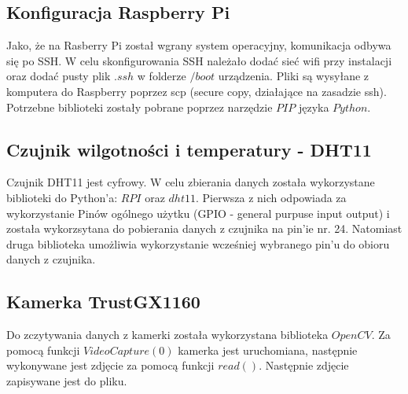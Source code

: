 \documentclass[runningheads]{llncs}
\begin{document}
\subsection{Konfiguracja Raspberry Pi}
Jako, że na Rasberry Pi został wgrany system operacyjny, komunikacja odbywa się po SSH. W celu skonfigurowania SSH należało dodać sieć wifi przy instalacji oraz dodać pusty plik $.ssh$ w folderze $/boot$ urządzenia. Pliki są wysyłane z komputera do Raspberry poprzez scp (secure copy, działające na zasadzie ssh). Potrzebne biblioteki zostały pobrane poprzez narzędzie $PIP$ języka $Python$.
\subsection{Czujnik wilgotności i temperatury - DHT11}
Czujnik DHT11 jest cyfrowy. W celu zbierania danych została wykorzystane biblioteki do Python'a: $RPI$ oraz $dht11$. Pierwsza z nich odpowiada za wykorzystanie Pinów ogólnego użytku (GPIO - general purpuse input output) i została wykorzsytana do pobierania danych z czujnika na pin'ie nr. 24. Natomiast druga biblioteka umożliwia wykorzystanie wcześniej wybranego pin'u do obioru danych z czujnika.
\subsection{Kamerka TrustGX1160}
Do zczytywania danych z kamerki została wykorzystana biblioteka $OpenCV$. Za pomocą funkcji $VideoCapture(0)$ kamerka jest uruchomiana, następnie wykonywane jest zdjęcie za pomocą funkcji $read()$. Następnie zdjęcie zapisywane jest do pliku.
\end{document}

